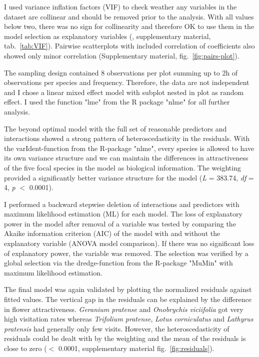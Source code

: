 
I used variance inflation factors (VIF) to check weather any variables in the dataset are collinear and should be removed prior to the analysis. With all values below two, there was no sign for collinearity and therefore OK to use them in the model selection as explanatory variables (\citealt{zuur2007analysing}, supplementary material, tab.~\ref{tab:VIF}). Pairwise scatterplots with included correlation of coefficients also showed only minor correlation (Supplementary material, fig.~\ref{fig:pairs-plot}).

The sampling design contained 8 observations per plot summing up to 2h of observations per species and frequency. Therefore, the data are not independent and I chose a linear mixed effect model with subplot nested in plot as random effect. I used the function "lme" from the R package "nlme" \citep{Rnlme} for all further analysis.

The beyond optimal model with the full set of reasonable predictors and interactions showed a strong pattern of heteroscedasticity in the residuals. With the varIdent-function from the R-package "nlme", every species is allowed to have its own variance structure and we can maintain the differences in attractiveness of the five focal species in the model as biological information. The weighting provided a significantly better variance structure for the model (\textit{L} = 383.74, \textit{df} = 4, \textit{p} $<$ 0.0001).

I performed a backward stepwise deletion of interactions and predictors with maximum likelihood estimation (ML) for each model. The loss of explanatory power in the model after removal of a variable was tested by comparing the Akaike information criterion (AIC) of the model with and without the explanatory variable (ANOVA model comparison). If there was no significant loss of explanatory power, the variable was removed. The selection was verified by a global selection via the dredge-function from the R-package "MuMin" \citep{MuMIn} with maximum likelihood estimation. 


The final model was again validated by plotting the normalized residuals against fitted values. The vertical gap in the residuals can be explained by the difference in flower attractiveness. \textit{Geranium pratense} and \textit{Onobrychis viciifolia} got very high visitation rates whereas \textit{Trifolium pratense}, \textit{Lotus corniculatus} and \textit{Lathyrus pratensis} had generally only few visits. However, the heteroscedasticity of residuals could be dealt with by the weighting and the mean of the residuals is close to zero ($<$ 0.0001, supplementary material fig.~\ref{fig:residuals}). 